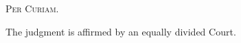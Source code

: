 
\setcounter{page}{440}

  \textsc{Per Curiam.}

  The judgment is affirmed by an equally divided Court.
